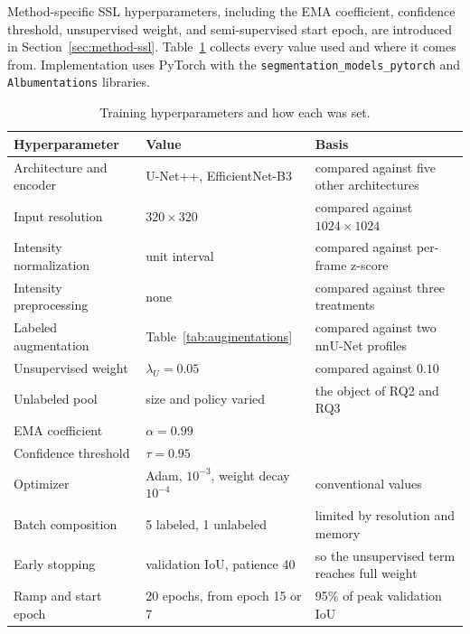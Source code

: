 \documentclass[
  msc,
  american
]{ThesisPUC_v2}
\begin{document}
Method-specific SSL hyperparameters, including the EMA coefficient, confidence threshold, unsupervised weight, and semi-supervised start epoch, are introduced in Section~\ref{sec:method-ssl}. Table~\ref{tab:hyperparams} collects every value used and where it comes from. Implementation uses PyTorch with the \texttt{segmentation\_models\_pytorch} and \texttt{Albumentations} libraries.

\begin{table}[!htbp]
\centering
\caption{Training hyperparameters and how each was set.}
\label{tab:hyperparams}
\footnotesize
\begin{tabular}{@{}llp{}@{}}
\toprule
\textbf{Hyperparameter} & \textbf{Value} & \textbf{Basis} \\
\midrule
Architecture and encoder & U-Net++, EfficientNet-B3 & compared against five other architectures \\
Input resolution         & $320 \times 320$         & compared against $1024 \times 1024$ \\
Intensity normalization  & unit interval            & compared against per-frame z-score \\
Intensity preprocessing  & none                     & compared against three treatments \\
Labeled augmentation     & Table~\ref{tab:augmentations} & compared against two nnU-Net profiles \\
Unsupervised weight      & $\lambda_U = 0.05$       & compared against $0.10$ \\
Unlabeled pool           & size and policy varied   & the object of RQ2 and RQ3 \\
EMA coefficient          & $\alpha = 0.99$          & \citet{ref_mean_teacher} \\
Confidence threshold     & $\tau = 0.95$            & \citet{ref_fixmatch} \\
Optimizer                & Adam, $10^{-3}$, weight decay $10^{-4}$ & conventional values \\
Batch composition        & 5 labeled, 1 unlabeled   & limited by resolution and memory \\
Early stopping           & validation IoU, patience 40 & so the unsupervised term reaches full weight \\
Ramp and start epoch     & 20 epochs, from epoch 15 or 7 & 95\% of peak validation IoU \\
\bottomrule
\end{tabular}
\end{table}
\end{document}
